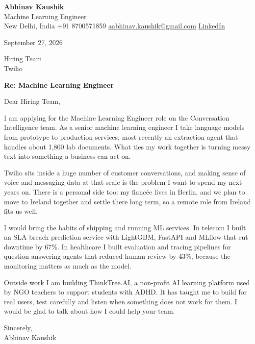 \documentclass[11pt,a4paper]{article}
\begin{document}
{\Large\bfseries Abhinav Kaushik}\\
Machine Learning Engineer\\
New Delhi, India \textbar{} +91 8700571859 \textbar{} \href{mailto:aabhinav.kaushik@gmail.com}{aabhinav.kaushik@gmail.com} \textbar{} \href{https://www.linkedin.com/in/abhinav-kaushik10/}{LinkedIn}  

September 27, 2026

Hiring Team\\
Twilio

\textbf{Re: Machine Learning Engineer}

Dear Hiring Team,

I am applying for the Machine Learning Engineer role on the Conversation Intelligence team. As a senior machine learning engineer I take language models from prototype to production services, most recently an extraction agent that handles about 1,800 lab documents. What ties my work together is turning messy text into something a business can act on.

Twilio sits inside a huge number of customer conversations, and making sense of voice and messaging data at that scale is the problem I want to spend my next years on. There is a personal side too: my fiancée lives in Berlin, and we plan to move to Ireland together and settle there long term, so a remote role from Ireland fits us well.

I would bring the habits of shipping and running ML services. In telecom I built an SLA breach prediction service with LightGBM, FastAPI and MLflow that cut downtime by 67\%. In healthcare I built evaluation and tracing pipelines for question-answering agents that reduced human review by 43\%, because the monitoring matters as much as the model.

Outside work I am building ThinkTree.AI, a non-profit AI learning platform used by NGO teachers to support students with ADHD. It has taught me to build for real users, test carefully and listen when something does not work for them. I would be glad to talk about how I could help your team.

Sincerely,\\[4pt]
Abhinav Kaushik
\end{document}
